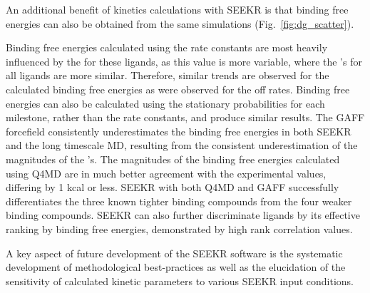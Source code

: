 
\par An additional benefit of kinetics calculations with SEEKR is that binding 
free energies can also be obtained from the same simulations (Fig.~\ref{fig:dg_scatter}). 

Binding free energies calculated using the rate constants %
are most heavily influenced by the \koff for these ligands, as this value is more variable, where 
the \kon's for all ligands are more similar. Therefore, similar trends are observed 
for the calculated binding free energies as were observed for the off rates.
Binding free energies can also be calculated using the stationary probabilities 
for each milestone, rather than the rate constants, and produce similar results.
The GAFF forcefield consistently underestimates the binding free energies in both 
SEEKR and the long timescale MD, resulting from the consistent underestimation 
of the magnitudes of the \koff's. The magnitudes of the binding free 
energies calculated using Q4MD are in much better agreement with the experimental 
values, differing by 1 kcal or less. SEEKR with both Q4MD and GAFF successfully 
differentiates the three known tighter binding compounds from the four weaker binding compounds.
SEEKR can also further discriminate ligands 
by its effective ranking %
by binding free energies, demonstrated by high rank correlation values.




%
\par A key aspect of future development of the SEEKR software is the systematic 
development of methodological best-practices as well as the elucidation of the 
sensitivity of calculated kinetic parameters to various SEEKR input conditions.

